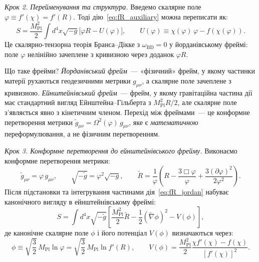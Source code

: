 \medskip
\noindent\textit{Крок 2. Перейменування та структура.}
Введемо скалярне поле $\varphi \equiv f'(\chi) = f'(R)$.
Тоді дію~\eqref{eq:fR_auxiliary} можна переписати як:
\begin{equation}\label{eq:fR_jordan}
  S = \frac{M_\mathrm{Pl}^2}{2}\int d^4x\sqrt{-g}
      \bigl[\varphi R - U(\varphi)\bigr],
  \qquad
  U(\varphi) \equiv \chi(\varphi)\,\varphi - f(\chi(\varphi)).
\end{equation}
Це скалярно-тензорна теорія Бранса--Дікке з $\omega_\mathrm{BD}=0$
у йорданівському фреймі: поле $\varphi$ нелінійно зачеплене з
кривизною через доданок $\varphi R$.

\begin{keybox}{Що таке фрейми?}
\emph{Йорданівський фрейм}~--- «фізичний» фрейм, у якому
частинки матерії рухаються геодезичними метрики $g_{\mu\nu}$,
а скалярне поле зачеплене з кривизною.
\emph{Ейнштейнівський фрейм}~--- фрейм, у якому гравітаційна
частина дії має стандартний вигляд Ейнштейна--Гільберта з $M_\mathrm{Pl}^2 R/2$,
але скалярне поле з'являється явно з кінетичним членом.
Перехід між фреймами~--- це конформне перетворення метрики
$\tilde g_{\mu\nu} = \Omega^2(\varphi)\,g_{\mu\nu}$,
яке є \emph{математичною} переформулювання, а не фізичним перетворенням.
\end{keybox}

\medskip
\noindent\textit{Крок 3. Конформне перетворення до ейнштейнівського фрейму.}
Виконаємо конформне перетворення метрики:
\begin{equation}\label{eq:conformal_transform}
  \tilde{g}_{\mu\nu} = \varphi\, g_{\mu\nu},
  \qquad
  \sqrt{-\tilde{g}} = \varphi^2\sqrt{-g},
  \qquad
  \tilde{R} = \frac{1}{\varphi}\left(R - \frac{3\Box\varphi}{\varphi}
  + \frac{3(\partial\varphi)^2}{2\varphi^2}\right).
\end{equation}
Після підстановки та інтегрування частинами дія~\eqref{eq:fR_jordan}
набуває канонічного вигляду в ейнштейнівському фреймі:
\begin{equation}\label{eq:fR_einstein}
  S = \int d^4x\sqrt{-\tilde{g}}\left[
      \frac{M_\mathrm{Pl}^2}{2}\tilde{R}
      - \frac{1}{2}(\tilde\nabla\phi)^2
      - V(\phi)
      \right],
\end{equation}
де канонічне скалярне поле $\phi$ і його потенціал $V(\phi)$
визначаються через:
\begin{equation}\label{eq:fR_canonical_field}
  \phi \equiv \sqrt{\frac{3}{2}}\,M_\mathrm{Pl}\ln\varphi
  = \sqrt{\frac{3}{2}}\,M_\mathrm{Pl}\ln f'(R),
  \qquad
  V(\phi) = \frac{M_\mathrm{Pl}^2}{2}
            \frac{\chi f'(\chi) - f(\chi)}{[f'(\chi)]^2}.
\end{equation}

